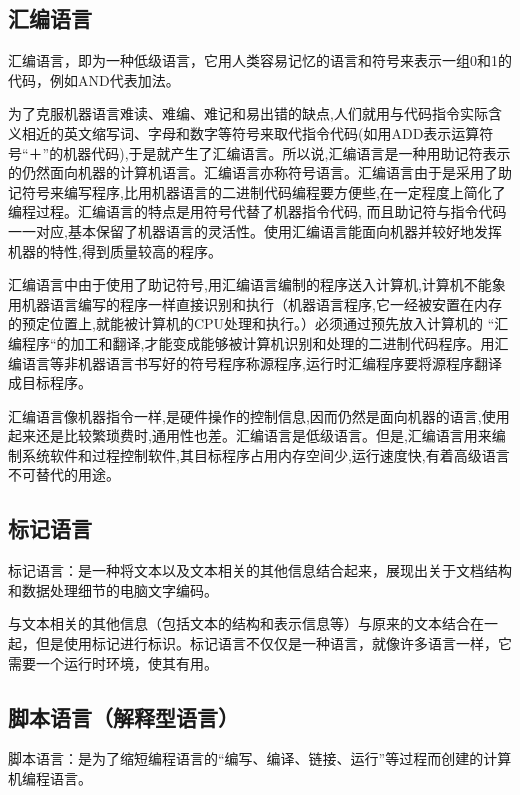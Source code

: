 \subsection{汇编语言}\label{CpLgg_sub2}

汇编语言，即为一种低级语言，它用人类容易记忆的语言和符号来表示一组0和1的代码，例如AND代表加法。

为了克服机器语言难读、难编、难记和易出错的缺点,人们就用与代码指令实际含义相近的英文缩写词、字母和数字等符号来取代指令代码(如用ADD表示运算符号“＋”的机器代码),于是就产生了汇编语言。所以说,汇编语言是一种用助记符表示的仍然面向机器的计算机语言。汇编语言亦称符号语言。汇编语言由于是采用了助记符号来编写程序,比用机器语言的二进制代码编程要方便些,在一定程度上简化了编程过程。汇编语言的特点是用符号代替了机器指令代码, 而且助记符与指令代码一一对应,基本保留了机器语言的灵活性。使用汇编语言能面向机器并较好地发挥机器的特性,得到质量较高的程序。

汇编语言中由于使用了助记符号,用汇编语言编制的程序送入计算机,计算机不能象用机器语言编写的程序一样直接识别和执行（机器语言程序,它一经被安置在内存的预定位置上,就能被计算机的CPU处理和执行。）必须通过预先放入计算机的 “汇编程序“的加工和翻译,才能变成能够被计算机识别和处理的二进制代码程序。用汇编语言等非机器语言书写好的符号程序称源程序,运行时汇编程序要将源程序翻译成目标程序。

汇编语言像机器指令一样,是硬件操作的控制信息,因而仍然是面向机器的语言,使用起来还是比较繁琐费时,通用性也差。汇编语言是低级语言。但是,汇编语言用来编制系统软件和过程控制软件,其目标程序占用内存空间少,运行速度快,有着高级语言不可替代的用途。

\subsection{标记语言}\label{CpLgg_sub3}

标记语言：是一种将文本以及文本相关的其他信息结合起来，展现出关于文档结构和数据处理细节的电脑文字编码。

与文本相关的其他信息（包括文本的结构和表示信息等）与原来的文本结合在一起，但是使用标记进行标识。标记语言不仅仅是一种语言，就像许多语言一样，它需要一个运行时环境，使其有用。

\subsection{脚本语言（解释型语言）}\label{CpLgg_sub4}

脚本语言：是为了缩短编程语言的“编写、编译、链接、运行”等过程而创建的计算机编程语言。

